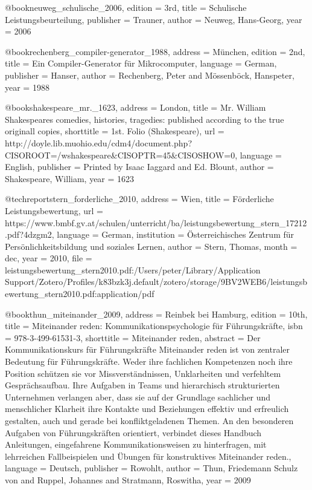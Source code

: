 {@book{neuweg_schulische_2006,
  edition   = {3rd},
  title     = {Schulische {Leistungsbeurteilung}},
  publisher = {Trauner},
  author    = {Neuweg, Hans-Georg},
  year      = {2006}
}

@book{rechenberg_compiler-generator_1988,
  address   = {M{\"u}nchen},
  edition   = {2nd},
  title     = {Ein {Compiler}-{Generator} f{\"u}r {Mikrocomputer}},
  language  = {German},
  publisher = {Hanser},
  author    = {Rechenberg, Peter and M{\"o}ssenb{\"o}ck, Hanspeter},
  year      = {1988}
}

@book{shakespeare_mr._1623,
  address    = {London},
  title      = {Mr. {William} {Shakespeares} comedies, histories, tragedies: published according to the true originall copies},
  shorttitle = {1st. {Folio} ({Shakespeare})},
  url        = {http://doyle.lib.muohio.edu/cdm4/document.php?CISOROOT=/wshakespeare&CISOPTR=45&CISOSHOW=0},
  language   = {English},
  publisher  = {Printed by Isaac Iaggard and Ed. Blount},
  author     = {Shakespeare, William},
  year       = {1623}
}

@techreport{stern_forderliche_2010,
  address     = {Wien},
  title       = {F{\"o}rderliche {Leistungsbewertung}},
  url         = {https://www.bmbf.gv.at/schulen/unterricht/ba/leistungsbewertung_stern_17212.pdf?4dzgm2},
  language    = {German},
  institution = {{\"O}sterreichisches Zentrum f{\"u}r Pers{\"o}nlichkeitsbildung und soziales Lernen},
  author      = {Stern, Thomas},
  month       = dec,
  year        = {2010},
  file        = {leistungsbewertung_stern2010.pdf:/Users/peter/Library/Application Support/Zotero/Profiles/k83bzk3j.default/zotero/storage/9BV2WEB6/leistungsbewertung_stern2010.pdf:application/pdf}
}

@book{thun_miteinander_2009,
  address    = {Reinbek bei Hamburg},
  edition    = {10th},
  title      = {Miteinander reden: {Kommunikationspsychologie} f{\"u}r {F{\"u}hrungskr{\"a}fte}},
  isbn       = {978-3-499-61531-3},
  shorttitle = {Miteinander reden},
  abstract   = {Der Kommunikationskurs f{\"u}r F{\"u}hrungskr{\"a}fte  Miteinander reden ist von zentraler Bedeutung f{\"u}r F{\"u}hrungskr{\"a}fte. Weder ihre fachlichen Kompetenzen noch ihre Position sch{\"u}tzen sie vor Missverst{\"a}ndnissen, Unklarheiten und verfehltem Gespr{\"a}chsaufbau. Ihre Aufgaben in Teams und hierarchisch strukturierten Unternehmen verlangen aber, dass sie auf der Grundlage sachlicher und menschlicher Klarheit ihre Kontakte und Beziehungen effektiv und erfreulich gestalten, auch und gerade bei konfliktgeladenen Themen.  An den besonderen Aufgaben von F{\"u}hrungskr{\"a}ften orientiert, verbindet dieses Handbuch Anleitungen, eingefahrene Kommunikationsweisen zu hinterfragen, mit lehrreichen Fallbeispielen und {\"U}bungen f{\"u}r konstruktives Miteinander reden.},
  language   = {Deutsch},
  publisher  = {Rowohlt},
  author     = {Thun, Friedemann Schulz von and Ruppel, Johannes and Stratmann, Roswitha},
  year       = {2009}
}

}
